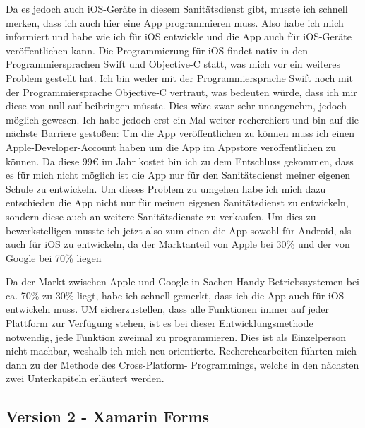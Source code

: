    Da es jedoch auch iOS-Geräte in diesem Sanitätsdienst gibt, musste ich schnell merken, 
    dass ich auch hier eine App programmieren muss. Also habe ich mich informiert und habe 
    wie ich für iOS entwickle und die App auch für iOS-Geräte veröffentlichen kann.
    Die Programmierung für iOS findet nativ in den Programmiersprachen Swift und Objective-C
    statt, was mich vor ein weiteres Problem gestellt hat. Ich bin weder mit der Programmiersprache
    Swift noch mit der Programmiersprache Objective-C vertraut, was bedeuten würde, dass ich mir
    diese von null auf beibringen müsste. Dies wäre zwar sehr unangenehm, jedoch möglich gewesen.
    Ich habe jedoch erst ein Mal weiter recherchiert und bin auf die nächste Barriere gestoßen:
    Um die App veröffentlichen zu können muss ich einen Apple-Developer-Account haben um die App
    im Appstore veröffentlichen zu können. Da diese 99€ im Jahr kostet bin ich zu dem Entschluss 
    gekommen, dass es für mich nicht möglich ist die App nur für den Sanitätsdienst meiner eigenen Schule
    zu entwickeln. Um dieses Problem zu umgehen habe ich mich dazu entschieden die App nicht 
    nur für meinen eigenen Sanitätsdienst zu entwickeln, sondern diese auch an weitere Sanitätsdienste
    zu verkaufen. Um dies zu bewerkstelligen musste ich jetzt also zum einen die App sowohl für
    Android, als auch für iOS zu entwickeln, da der Marktanteil von Apple bei 30\% und der von Google bei
    70\% liegen


    Da der Markt zwischen Apple und Google in Sachen Handy-Betriebssystemen bei ca. 70\% zu
    30\% liegt\cite[vgl.]{Marktanteil}, habe ich schnell gemerkt, dass ich die App auch für 
    iOS entwickeln muss. UM sicherzustellen, dass alle Funktionen immer auf jeder Plattform 
    zur Verfügung stehen, ist es bei dieser Entwicklungsmethode notwendig, jede Funktion 
    zweimal zu programmieren. Dies ist als Einzelperson nicht machbar, weshalb ich mich neu
    orientierte. Recherchearbeiten führten mich dann zu der Methode des Cross-Platform-
    Programmings, welche in den nächsten zwei Unterkapiteln erläutert werden.

\subsection{Version 2 - Xamarin Forms}

